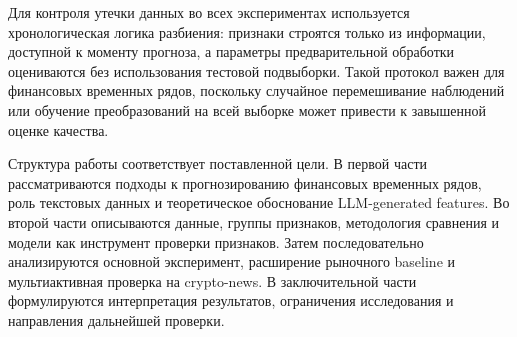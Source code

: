 Для контроля утечки данных во всех экспериментах используется хронологическая логика разбиения: признаки строятся только из информации, доступной к моменту прогноза, а параметры предварительной обработки оцениваются без использования тестовой подвыборки. Такой протокол важен для финансовых временных рядов, поскольку случайное перемешивание наблюдений или обучение преобразований на всей выборке может привести к завышенной оценке качества.

Структура работы соответствует поставленной цели. В первой части рассматриваются подходы к прогнозированию финансовых временных рядов, роль текстовых данных и теоретическое обоснование LLM-generated features. Во второй части описываются данные, группы признаков, методология сравнения и модели как инструмент проверки признаков. Затем последовательно анализируются основной эксперимент, расширение рыночного baseline и мультиактивная проверка на crypto-news. В заключительной части формулируются интерпретация результатов, ограничения исследования и направления дальнейшей проверки.
